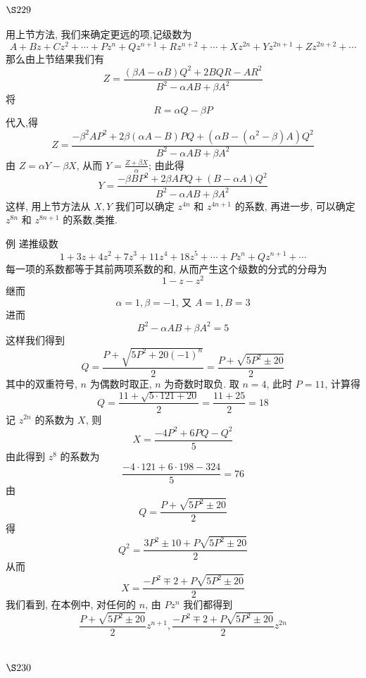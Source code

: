 \section{$\S 229$}

用上节方法, 我们来确定更远的项,记级数为
\[
A+B z+C z^{2}+\cdots+P z^{n}+Q z^{n+1}+R z^{n+2}+\cdots+X z^{2 n}+Y z^{2 n+1}+Z z^{2 n+2}+\cdots
\]
那么由上节结果我们有
\[
Z=\frac{(\beta A-\alpha B) Q^{2}+2 B Q R-A R^{2}}{B^{2}-\alpha A B+\beta A^{2}}
\]
将
\[
R=\alpha Q-\beta P
\]
代入,得
\[
Z=\frac{-\beta^{2} A P^{2}+2 \beta(\alpha A-B) P Q+\left(\alpha B-\left(\alpha^{2}-\beta\right) A\right) Q^{2}}{B^{2}-\alpha A B+\beta A^{2}}
\]
由 $Z=\alpha Y-\beta X$, 从而 $Y=\frac{Z+\beta X}{\alpha}$; 由此得
\[
Y=\frac{-\beta B P^{2}+2 \beta A P Q+(B-\alpha A) Q^{2}}{B^{2}-\alpha A B+\beta A^{2}}
\]
这样, 用上节方法从 $X, Y$ 我们可以确定 $z^{4 n}$ 和 $z^{4 n+1}$ 的系数, 再进一步, 可以确定 $z^{8 n}$ 和 $z^{8 n+1}$ 的系数,类推.

例 递推级数
\[
1+3 z+4 z^{2}+7 z^{3}+11 z^{4}+18 z^{5}+\cdots+P z^{n}+Q z^{n+1}+\cdots
\]
每一项的系数都等于其前两项系数的和, 从而产生这个级数的分式的分母为
\[
1-z-z^{2}
\]
继而
\[
\alpha=1, \beta=-1 \text {, 又 } A=1, B=3
\]
进而
\[
B^{2}-\alpha A B+\beta A^{2}=5
\]
这样我们得到
\[
Q=\frac{P+\sqrt{5 P^{2}+20(-1)^{n}}}{2}=\frac{P+\sqrt{5 P^{2} \pm 20}}{2}
\]
其中的双重符号, $n$ 为偶数时取正, $n$ 为奇数时取负. 取 $n=4$, 此时 $P=11$, 计算得
\[
Q=\frac{11+\sqrt{5 \cdot 121+20}}{2}=\frac{11+25}{2}=18
\]
记 $z^{2 n}$ 的系数为 $X$, 则
\[
X=\frac{-4 P^{2}+6 P Q-Q^{2}}{5}
\]
由此得到 $z^{8}$ 的系数为
\[
\frac{-4 \cdot 121+6 \cdot 198-324}{5}=76
\]
由
\[
Q=\frac{P+\sqrt{5 P^{2} \pm 20}}{2}
\]
得
\[
Q^{2}=\frac{3 P^{2} \pm 10+P \sqrt{5 P^{2} \pm 20}}{2}
\]
从而
\[
X=\frac{-P^{2} \mp 2+P \sqrt{5 P^{2} \pm 20}}{2}
\]
我们看到, 在本例中, 对任何的 $n$, 由 $P z^{n}$ 我们都得到
\[
\frac{P+\sqrt{5 P^{2} \pm 20}}{2} z^{n+1}, \frac{-P^{2} \mp 2+P \sqrt{5 P^{2} \pm 20}}{2} z^{2 n}
\]
\section{$\S 230$}

